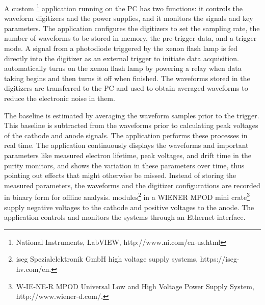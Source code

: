 A custom \footnote{National Instruments, LabVIEW\texttrademark{}, http://www.ni.com/en-us.html} application running on the  PC has two functions: it controls the waveform digitizers and the power supplies, and it monitors the signals and key parameters. The application configures the digitizers to set the sampling rate, the number of waveforms to be stored in memory, the pre-trigger data, and a trigger mode. A signal from a photodiode triggered by the xenon flash lamp is fed directly into the digitizer as an external trigger to initiate data acquisition.    automatically turns on the xenon flash lamp by powering a relay when data taking begins and then turns it off when finished.
The waveforms stored in the digitizers are transferred to the  PC and used to obtain averaged waveforms to reduce the electronic noise in them. %

The baseline  is estimated by averaging the waveform samples prior to the trigger. This baseline is subtracted from the waveforms prior to calculating peak voltages of the cathode and anode signals. %
The application performs these processes in real time. %
 The application continuously displays the waveforms and important parameters like measured electron lifetime, peak voltages, and drift time %
in the purity monitors, and shows the variation in these parameters over time, thus pointing out %
effects that might otherwise be missed. %
Instead of storing the measured parameters, the waveforms and the digitizer configurations are recorded in binary form for offline analysis.   modules\footnote{iseg Spezialelektronik GmbH\texttrademark{} high voltage supply systems, https://iseg-hv.com/en.} in a WIENER MPOD mini crate\footnote{W-IE-NE-R MPOD\texttrademark{} Universal Low and High Voltage Power Supply System, http://www.wiener-d.com/.} supply negative voltages to the cathode and positive voltages to the anode. The   application controls and monitors the  systems through an Ethernet interface.

